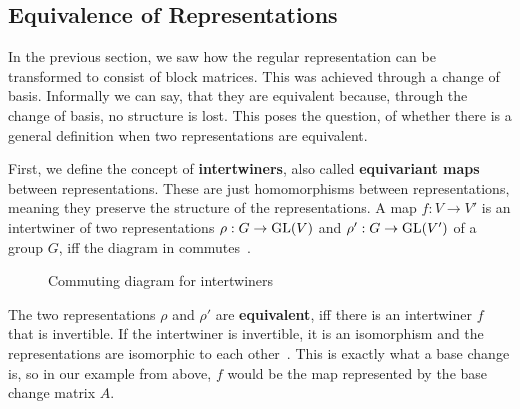 \subsection{Equivalence of Representations}
\label{sec:basics.equ}

In the previous section, we saw how the regular representation can be transformed to consist of block matrices.
This was achieved through a change of basis.
Informally we can say, that they are equivalent because, through the change of basis, no structure is lost.
This poses the question, of whether there is a general definition when two representations are equivalent.

First, we define the concept of \textbf{intertwiners}, also called \textbf{equivariant maps} between representations.
These are just homomorphisms between representations, meaning they preserve the structure of the representations.
A map $f: V \to V'$ is an intertwiner of two representations $\rho: G \to \operatorname{GL}(V)$ and $\rho': G \to \operatorname{GL}(V')$ of a group $G$, iff the diagram in  commutes~\cite{fuchs2003}.

\begin{figure}[h]
    \centering
    \caption{Commuting diagram for intertwiners}
    \label{fig:main.what.equ-cd}
\end{figure}

The two representations $\rho$ and $\rho'$ are \textbf{equivalent}, iff there is an intertwiner $f$ that is invertible.
If the intertwiner is invertible, it is an isomorphism and the representations are isomorphic to each other~\cite{hein2013,fuchs2003}.
This is exactly what a base change is, so in our example from above, $f$ would be the map represented by the base change matrix $A$.
